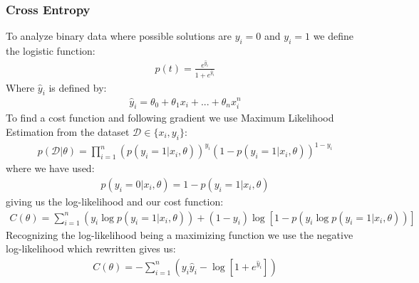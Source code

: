 \documentclass[11pt]{article}
\begin{document}
\subsubsection*{Cross Entropy}
To analyze binary data where possible solutions are $y_i=0$ and $y_i=1$ we define the logistic function:
\begin{align}
    \label{eq:logistic}
    p(t) =  \frac{e^{\hat{y}_i}}{1+e^{\hat{y}_i}}
\end{align}
Where $\hat{y}_i$ is defined by:
\begin{align*}
    \hat{y}_i = \theta_0 + \theta_1 x_i +...+ \theta_n x_i^n
\end{align*}
To find a cost function and following gradient we use Maximum Likelihood Estimation from the dataset $\mathcal{D} \in \{x_i, y_i\}$:
\begin{align*}
    p(\mathcal{D}|\theta) = \prod_{i=1}^n (p(y_i = 1|x_i,\theta))^{y_i}\left( 1- p(y_i = 1 | x_i, \theta)\right)^{1-y_i}
\end{align*}
where we have used:
\begin{align*}
    p(y_i=0|x_i, \theta ) = 1 - p(y_i=1 | x_i, \theta)
\end{align*}
giving us the log-likelihood and our cost function:
\begin{align*}
    C(\theta) = \sum_{i=1}^n (y_i \log p(y_i =1 | x_i, \theta)) + (1- y_i) \log [1 - p(y_i \log p(y_i =1 | x_i, \theta))]
\end{align*}
Recognizing the log-likelihood being a maximizing function we use the negative log-likelihood which rewritten gives us:
\begin{align}
    \label{eq:cross}
    C(\theta) = -\sum_{i=1}^n (y_i \hat{y}_i - \log [1 + e^{\hat{y}_i}])
\end{align}
\end{document}
